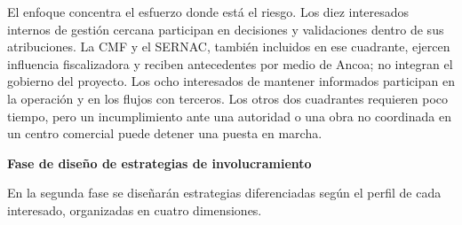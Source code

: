\documentclass[11pt]{article}
\begin{document}
El enfoque concentra el esfuerzo donde está el riesgo. Los diez
interesados internos de gestión cercana participan en decisiones y
validaciones dentro de sus atribuciones. La CMF y el SERNAC, también
incluidos en ese cuadrante, ejercen influencia fiscalizadora y reciben
antecedentes por medio de Ancoa; no integran el gobierno del proyecto.
Los ocho interesados de mantener informados participan en la operación
y en los flujos con terceros. Los otros dos cuadrantes requieren poco
tiempo, pero un incumplimiento ante una autoridad o una obra no
coordinada en un centro comercial puede detener una puesta en marcha.

\textbf{Fase de diseño de estrategias de involucramiento}

En la segunda fase se diseñarán estrategias diferenciadas según el
perfil de cada interesado, organizadas en cuatro dimensiones.
\end{document}
